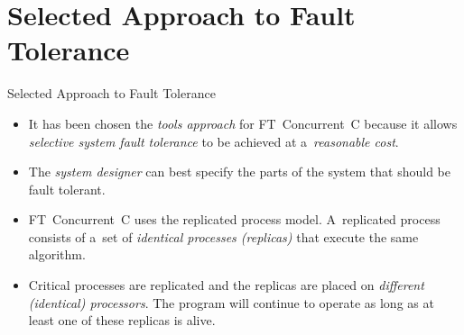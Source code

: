 \documentclass[
    10pt, hyperref={unicode, colorlinks, hypertexnames=false,
    linkcolor=white}, aspectratio=169
]{beamer}
\begin{document}
\section{Selected Approach to Fault Tolerance}
\begin{frame}{Selected Approach to Fault Tolerance}
    \begin{itemize}\setlength\itemsep{2em}
        \item
            It has been chosen the \emph{tools approach} for
            \alert{FT~Concurrent~C} because it allows \emph{selective system
            fault tolerance} to be achieved at a~\emph{reasonable cost}.

        \item
            The \emph{system designer} can best specify the parts of the
            system that should be fault tolerant.

        \item
            \alert{FT~Concurrent~C} uses the \alert{replicated process}
            model. A~replicated process consists of a~set of \emph{identical
            processes (replicas)} that execute the same algorithm.

        \item
            \alert{Critical processes} are replicated and the replicas are
            placed on \emph{different (identical) processors}. The program
            will continue to operate as long as at least one of these
            replicas is alive.
    \end{itemize}
\end{frame}
\end{document}
